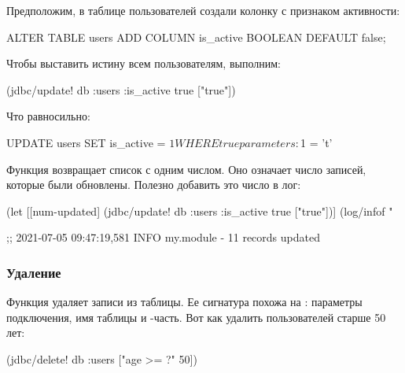 Предположим, в таблице пользователей создали колонку с признаком активности:

\begin{english}
  \begin{sql}
ALTER TABLE users ADD COLUMN is_active BOOLEAN DEFAULT false;
  \end{sql}
\end{english}

Чтобы выставить истину всем пользователям, выполним:

\begin{english}
  \begin{clojure}
(jdbc/update! db :users {:is_active true} ["true"])
  \end{clojure}
\end{english}

Что равносильно:

\begin{english}
  \begin{sql}
UPDATE users SET is_active = $1 WHERE true
parameters: $1 = 't'
  \end{sql}
\end{english}

Функция  возвращает список с одним числом. Оно означает число записей, которые были обновлены. Полезно добавить это число в лог:

\begin{english}
  \begin{clojure}
(let [[num-updated]
      (jdbc/update! db :users {:is_active true} ["true"])]
  (log/infof "%

;; 2021-07-05 09:47:19,581 INFO  my.module - 11 records updated
  \end{clojure}
\end{english}

\subsubsection{Удаление}

Функция  удаляет записи из таблицы. Ее сигнатура похожа на : параметры подключения, имя таблицы и -часть. Вот как удалить пользователей старше 50 лет:

\begin{english}
  \begin{clojure}
(jdbc/delete! db :users ["age >= ?" 50])
  \end{clojure}
\end{english}

